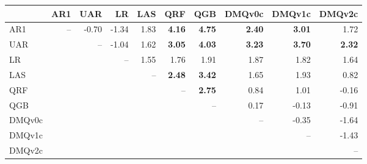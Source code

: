 \begin{tabular}{lrrrrrrrrr}
\toprule
 & AR1 & UAR & LR & LAS & QRF & QGB & DMQv0c & DMQv1c & DMQv2c \\
\midrule
AR1 & -- & -0.70 & -1.34 & 1.83 & \textbf{4.16} & \textbf{4.75} & \textbf{2.40} & \textbf{3.01} & 1.72 \\
UAR &  & -- & -1.04 & 1.62 & \textbf{3.05} & \textbf{4.03} & \textbf{3.23} & \textbf{3.70} & \textbf{2.32} \\
LR &  &  & -- & 1.55 & 1.76 & 1.91 & 1.87 & 1.82 & 1.64 \\
LAS &  &  &  & -- & \textbf{2.48} & \textbf{3.42} & 1.65 & 1.93 & 0.82 \\
QRF &  &  &  &  & -- & \textbf{2.75} & 0.84 & 1.01 & -0.16 \\
QGB &  &  &  &  &  & -- & 0.17 & -0.13 & -0.91 \\
DMQv0c &  &  &  &  &  &  & -- & -0.35 & -1.64 \\
DMQv1c &  &  &  &  &  &  &  & -- & -1.43 \\
DMQv2c &  &  &  &  &  &  &  &  & -- \\
\bottomrule
\end{tabular}

